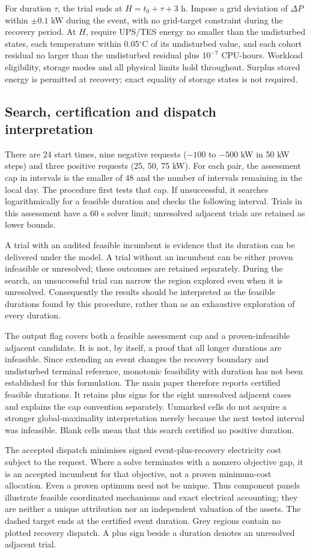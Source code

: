 For duration $\tau$, the trial ends at $H=t_0+\tau+3$ h. Impose a grid deviation of $\Delta P$ within $\pm0.1$ kW during the event, with no grid-target constraint during the recovery period. At $H$, require UPS/TES energy no smaller than the undisturbed states, each temperature within 0.05$^{\circ}$C of its undisturbed value, and each cohort residual no larger than the undisturbed residual plus $10^{-7}$ CPU-hours. Workload eligibility, storage modes and all physical limits hold throughout. Surplus stored energy is permitted at recovery; exact equality of storage states is not required.

\subsection{Search, certification and dispatch interpretation}
There are 24 start times, nine negative requests ($-100$ to $-500$ kW in 50 kW steps) and three positive requests (25, 50, 75 kW). For each pair, the assessment cap in intervals is the smaller of 48 and the number of intervals remaining in the local day. The procedure first tests that cap. If unsuccessful, it searches logarithmically for a feasible duration and checks the following interval. Trials in this assessment have a 60 s solver limit; unresolved adjacent trials are retained as lower bounds.

A trial with an audited feasible incumbent is evidence that its duration can be delivered under the model. A trial without an incumbent can be either proven infeasible or unresolved; these outcomes are retained separately. During the search, an unsuccessful trial can narrow the region explored even when it is unresolved. Consequently the results should be interpreted as the feasible durations found by this procedure, rather than as an exhaustive exploration of every duration.

The output flag  covers both a feasible assessment cap and a proven-infeasible adjacent candidate. It is not, by itself, a proof that all longer durations are infeasible. Since extending an event changes the recovery boundary and undisturbed terminal reference, monotonic feasibility with duration has not been established for this formulation. The main paper therefore reports certified feasible durations. It retains plus signs for the eight unresolved adjacent cases and explains the cap convention separately. Unmarked cells do not acquire a stronger global-maximality interpretation merely because the next tested interval was infeasible. Blank cells mean that this search certified no positive duration.

The accepted dispatch minimises signed event-plus-recovery electricity cost subject to the request. Where a solve terminates with a nonzero objective gap, it is an accepted incumbent for that objective, not a proven minimum-cost allocation. Even a proven optimum need not be unique. Thus component panels illustrate feasible coordinated mechanisms and exact electrical accounting; they are neither a unique attribution nor an independent valuation of the assets. The dashed target ends at the certified event duration. Grey regions contain no plotted recovery dispatch. A plus sign beside a duration denotes an unresolved adjacent trial.
